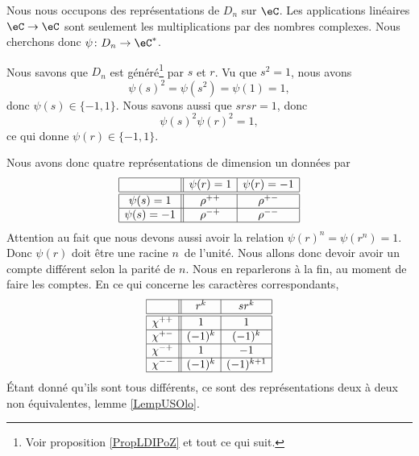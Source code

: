 Nous nous occupons des représentations de \( D_n\) sur \( \eC\). Les applications linéaires \( \eC\to \eC\) sont seulement les multiplications par des nombres complexes. Nous cherchons donc \( \psi\colon D_n\to \eC^*\).

Nous savons que \( D_n\) est généré\footnote{Voir proposition \ref{PropLDIPoZ} et tout ce qui suit.} par \( s\) et \( r\). Vu que \( s^2=1\), nous avons
\begin{equation}
    \psi(s)^2=\psi(s^2)=\psi(1)=1,
\end{equation}
donc \( \psi(s)\in\{ -1,1 \}\). Nous savons aussi que \( srsr=1\), donc
\begin{equation}
    \psi(s)^2\psi(r)^2=1,
\end{equation}
ce qui donne \( \psi(r)\in\{ -1,1 \}\).

Nous avons donc quatre représentations de dimension un données par
\begin{equation*}
    \begin{array}[]{|c||c|c|}
        \hline
        &\psi(r)=1&\psi(r)=-1\\
        \hline\hline
        \psi(s)=1&\rho^{++}&\rho^{+-}\\
        \hline
        \psi(s)=-1&\rho^{-+}&\rho^{--}\\
        \hline
    \end{array}
\end{equation*}
Attention au fait que nous devons aussi avoir la relation \( \psi(r)^n=\psi(r^n)=1\). Donc \( \psi(r)\) doit être une racine \( n\)\ieme\ de l'unité. Nous allons donc devoir avoir un compte différent selon la parité de \( n\). Nous en reparlerons à la fin, au moment de faire les comptes. En ce qui concerne les caractères correspondants,
\begin{equation*}
    \begin{array}[]{|c||c|c|}
        \hline
        &r^k&sr^k\\
        \hline\hline
        \chi^{++}&1&1\\
        \hline
        \chi^{+-}&(-1)^k&(-1)^k\\
        \hline
        \chi^{-+}&1&-1\\
        \hline
        \chi^{--}&(-1)^k&(-1)^{k+1}\\
        \hline
    \end{array}
\end{equation*}
Étant donné qu'ils sont tous différents, ce sont des représentations deux à deux non équivalentes, lemme \ref{LempUSOlo}.


